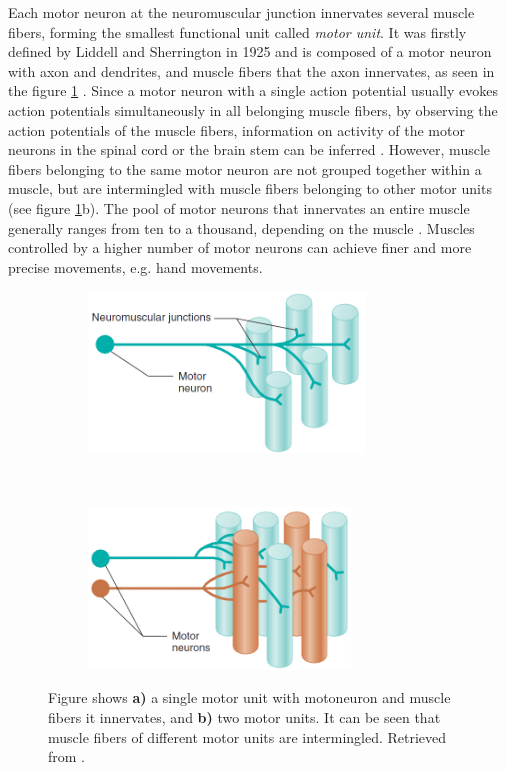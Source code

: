 Each motor neuron at the neuromuscular junction innervates several muscle fibers, forming the smallest functional unit called \emph{motor unit}. It was firstly defined by Liddell and Sherrington in 1925 \citep{Liddell1925, Sherrington1925} and is composed of a motor neuron with axon and dendrites, and muscle fibers that the axon innervates, as seen in the figure \ref{fig:motor units} \citep{Duchateau2011}. Since a motor neuron with a single action potential usually evokes action potentials simultaneously in all belonging muscle fibers, by observing the action potentials of the muscle fibers, information on activity of the motor neurons in the spinal cord or the brain stem can be inferred \citep{Merletti-Farina-book}. However, muscle fibers belonging to the same motor neuron are not grouped together within a muscle, but are intermingled with muscle fibers belonging to other motor units (see figure \ref{fig:motor units}b). The pool of motor neurons that innervates an entire muscle generally ranges from ten to a thousand, depending on the muscle \citep{Merletti-Farina-book}. Muscles controlled by a higher number of motor neurons can achieve finer and more precise movements, e.g. hand movements.
\begin{figure}[t!]
    \centering
    \begin{subfigure}[t]{0.49\textwidth}
        \centering
        \includegraphics[height=1.7in]{Images/introduction/one_MU.png}
        \caption{}
    \end{subfigure}%
    ~ 
    \begin{subfigure}[t]{0.49\textwidth}
        \centering
        \includegraphics[height=1.7in]{Images/introduction/two_MU.png}
        \caption{}
    \end{subfigure}
    \caption{Figure shows \textbf{a)} a single motor unit with motoneuron and muscle fibers it innervates, and \textbf{b)} two motor units. It can be seen that muscle fibers of different motor units are intermingled. Retrieved from \citet{Widmaier2014}.}
\label{fig:motor units}
\end{figure}


